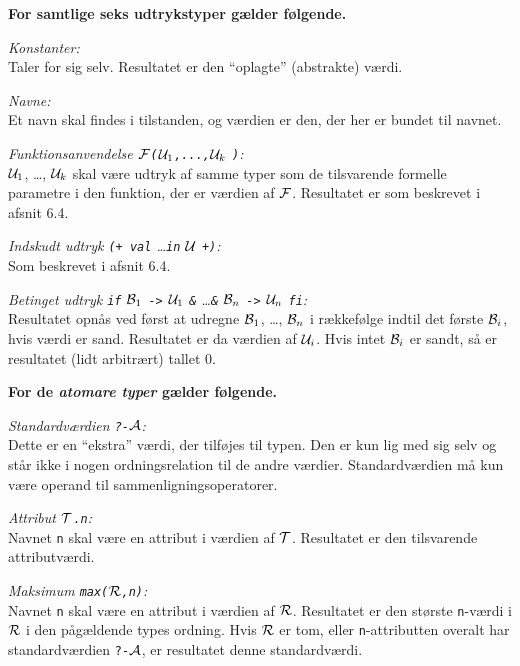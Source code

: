 \documentclass{article}
\newcounter{eks}
\begin{document}
{\bf For samtlige seks udtrykstyper g\ae{}lder f\o{}lgende.}

{\em Konstanter:}\\
Taler for sig selv. Resultatet er den ``oplagte'' (abstrakte) v\ae{}rdi.

{\em Navne:}\\
Et navn skal findes i tilstanden, og v\ae{}rdien er den,
der her er bundet til navnet.

{\em Funktionsanvendelse $\cal F$\verb"("${\cal U}_1$\verb",...,"${\cal U}_k$
\verb")":}\\
${\cal U}_1$, \ldots, ${\cal U}_k$ skal v\ae{}re udtryk af samme typer
som de tilsvarende formelle parametre i den funktion, der er
v\ae{}rdien af $\cal F$. Resultatet er som beskrev\-et i afsnit 6.4.

{\em Indskudt udtryk \verb"(+ val" \ldots \verb"in" $\cal U$ \verb"+)":}\\
Som beskrevet i afsnit 6.4.

{\em Betinget udtryk \verb"if" ${\cal B}_1$ \verb"->" ${\cal U}_1$
\verb"&" \ldots \verb"&" ${\cal B}_n$ \verb"->" ${\cal U}_n$ \verb"fi":}\\
Resultatet opn\aa{}s ved f\o{}rst at udregne ${\cal B}_1$, \ldots,
${\cal B}_n$ i r\ae{}kkef\o{}lge indtil det f\o{}rste ${\cal B}_i$,
hvis v\ae{}rdi er sand. Resultatet er da v\ae{}rdien af
${\cal U}_i$. Hvis intet ${\cal B}_i$ er sandt, s\aa{} er resultatet
(lidt arbitr\ae{}rt) tallet 0.

{\bf For de {\em atomare typer\/} g\ae{}lder f\o{}lgende.}

{\em Standardv\ae{}rdien \verb"?-"$\cal A$:}\\
Dette er en ``ekstra'' v\ae{}rdi, der tilf\o{}jes til typen.
Den er kun lig med sig selv og st\aa{}r ikke i nogen ordningsrelation
til de andre v\ae{}rdier. Standardv\ae{}rdien m\aa{} kun v\ae{}re
operand til sammenligningsoperatorer.

{\em Attribut $\cal T$\verb".n":}\\
Navnet \verb"n" skal v\ae{}re en attribut i v\ae{}rdien af $\cal T$.
Resultatet er den til\-svar\-en\-de attributv\ae{}rdi.

{\em Maksimum \verb"max("$\cal R$\verb",n)":}\\
Navnet \verb"n" skal v\ae{}re en attribut i v\ae{}rdien af $\cal R$.
Resultatet er den st\o{}rste \verb"n"-v\ae{}rdi i $\cal R$ i den
p\aa{}g\ae{}ldende types ordning. Hvis $\cal R$ er tom, eller
\verb"n"-attributten overalt har standardv\ae{}rdien \verb"?-"$\cal A$,
er resultatet denne standardv\ae{}rdi.
\end{document}
